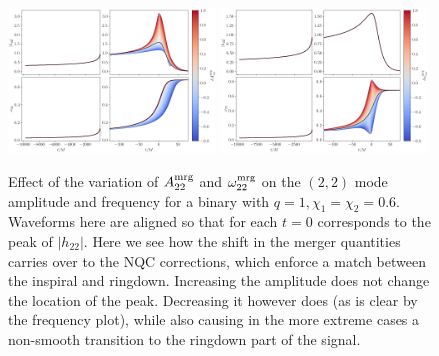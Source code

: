 \documentclass[prd,amssymb,amsmath,amsfonts,nofootinbib,reprint,showpacs,longbibliography]{revtex4-1}
\newcommand{\amrg}[1]{{A_{#1}^{\rm mrg}}}
\newcommand{\omgmrg}[1]{{\omega_{#1}^{\rm mrg}}}
\begin{document}
\begin{figure}
    \includegraphics[width=0.49\textwidth]{figs/delta_A22_mrg_-0.8_1.0.png}
    \includegraphics[width=0.49\textwidth]{figs/delta_Omg22_mrg_-0.8_1.0.png}
    \caption{Effect of the variation of $\amrg{22}$ and $\omgmrg{22}$ on the $(2,2)$ mode amplitude and frequency
    for a binary with $q = 1, \chi_1 = \chi_2 = 0.6$. Waveforms here are aligned so that for each
    $t = 0$ corresponds to the peak of $|h_{22}|$. Here we see how the shift in the merger quantities carries
    over to the NQC corrections, which enforce a match between the inspiral and ringdown. Increasing the amplitude
    does not change the location of the peak. Decreasing it however does (as is clear by the frequency plot),
    while also causing in the more extreme cases a non-smooth transition to the ringdown part of the signal.}
\end{figure}
\end{document}
